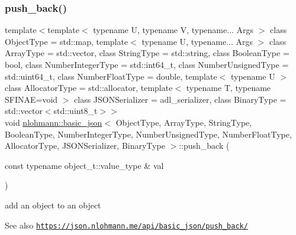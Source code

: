 \subsubsection{\texorpdfstring{push\+\_\+back()}{push\_back()}\hspace{0.1cm}{\footnotesize\ttfamily [3/4]}}
{\footnotesize\ttfamily template$<$template$<$ typename U, typename V, typename... Args $>$ class Object\+Type = std\+::map, template$<$ typename U, typename... Args $>$ class Array\+Type = std\+::vector, class String\+Type  = std\+::string, class Boolean\+Type  = bool, class Number\+Integer\+Type  = std\+::int64\+\_\+t, class Number\+Unsigned\+Type  = std\+::uint64\+\_\+t, class Number\+Float\+Type  = double, template$<$ typename U $>$ class Allocator\+Type = std\+::allocator, template$<$ typename T, typename S\+F\+I\+N\+A\+E=void $>$ class J\+S\+O\+N\+Serializer = adl\+\_\+serializer, class Binary\+Type  = std\+::vector$<$std\+::uint8\+\_\+t$>$$>$ \\
void \hyperlink{classnlohmann_1_1basic__json}{nlohmann\+::basic\+\_\+json}$<$ Object\+Type, Array\+Type, String\+Type, Boolean\+Type, Number\+Integer\+Type, Number\+Unsigned\+Type, Number\+Float\+Type, Allocator\+Type, J\+S\+O\+N\+Serializer, Binary\+Type $>$\+::push\+\_\+back (\begin{DoxyParamCaption}\item[{const typename object\+\_\+t\+::value\+\_\+type \&}]{val }\end{DoxyParamCaption})\hspace{0.3cm}{\ttfamily [inline]}}



add an object to an object 

\begin{DoxySeeAlso}{See also}
\href{https://json.nlohmann.me/api/basic_json/push_back/}{\tt https\+://json.\+nlohmann.\+me/api/basic\+\_\+json/push\+\_\+back/} 
\end{DoxySeeAlso}
\mbox{\label{classnlohmann_1_1basic__json_a4567cf75f19b1efca090f75d7a8a350a}} 
